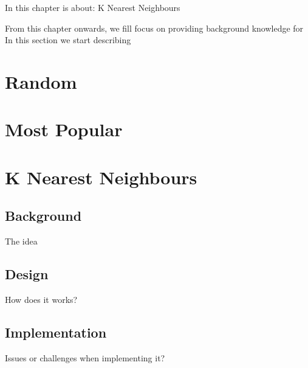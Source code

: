 In this chapter is about: K Nearest Neighbours

From this chapter onwards, we fill focus on providing background knowledge for In this section we start describing 

\section{Random}

\section{Most Popular}

\section{K Nearest Neighbours}

\subsection{Background}
The idea

\subsection{Design}
How does it works?

\subsection{Implementation}
Issues or challenges when implementing it?